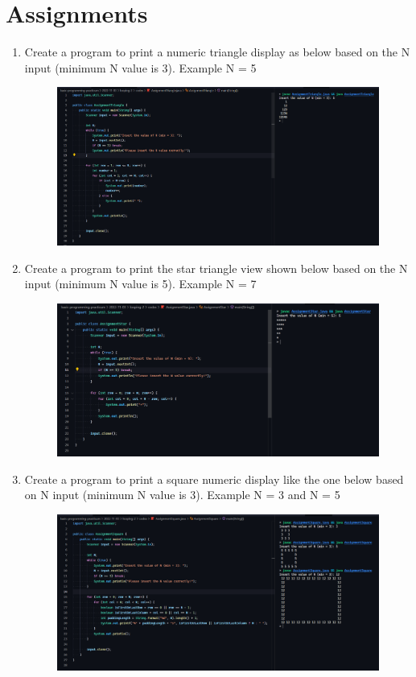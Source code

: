 \documentclass[12pt,titlepage]{article}
\begin{document}
\pagebreak

\section{Assignments}
\begin{enumerate}
    \item {
        Create a program to print a numeric triangle display as below based on the N input (minimum N value is 3). Example N = 5

        \begin{figure}[h]
            \centering
            \includegraphics[width=.8\textwidth]{./images/assignment-triangle.png}
        \end{figure}
    }
    \item {
        Create a program to print the star triangle view shown below based on the N input (minimum N value is 5). Example N = 7
    
        \begin{figure}[h]
            \centering
            \includegraphics[width=.8\textwidth]{./images/assignment-star.png}
        \end{figure}
    }
    \pagebreak
    \item {
        Create a program to print a square numeric display like the one below based on N input (minimum N value is 3). Example N = 3 and N = 5

        \begin{figure}[h]
            \centering
            \includegraphics[width=.8\textwidth]{./images/assignment-square.png}
        \end{figure}
    }


\end{enumerate}
\end{document}
